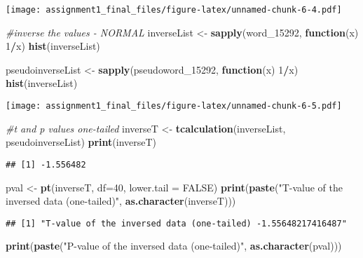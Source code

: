 \documentclass[
]{article}
\newenvironment{Shaded}{\begin{snugshade}}{\end{snugshade}}
\newcommand{\AttributeTok}[1]{\textcolor[rgb]{0.13,0.29,0.53}{#1}}
\newcommand{\CommentTok}[1]{\textcolor[rgb]{0.56,0.35,0.01}{\textit{#1}}}
\newcommand{\ConstantTok}[1]{\textcolor[rgb]{0.56,0.35,0.01}{#1}}
\newcommand{\ControlFlowTok}[1]{\textcolor[rgb]{0.13,0.29,0.53}{\textbf{#1}}}
\newcommand{\DecValTok}[1]{\textcolor[rgb]{0.00,0.00,0.81}{#1}}
\newcommand{\FunctionTok}[1]{\textcolor[rgb]{0.13,0.29,0.53}{\textbf{#1}}}
\newcommand{\NormalTok}[1]{#1}
\newcommand{\OtherTok}[1]{\textcolor[rgb]{0.56,0.35,0.01}{#1}}
\newcommand{\SpecialCharTok}[1]{\textcolor[rgb]{0.81,0.36,0.00}{\textbf{#1}}}
\newcommand{\StringTok}[1]{\textcolor[rgb]{0.31,0.60,0.02}{#1}}
\begin{document}
\texttt{[image: assignment1\_final\_files/figure-latex/unnamed-chunk-6-4.pdf]}

\begin{Shaded}
\begin{Highlighting}[]
\CommentTok{\#inverse the values {-} NORMAL}
\NormalTok{inverseList  }\OtherTok{\textless{}{-}} \FunctionTok{sapply}\NormalTok{(word\_15292, }\ControlFlowTok{function}\NormalTok{(x) }\DecValTok{1}\SpecialCharTok{/}\NormalTok{x)}
\FunctionTok{hist}\NormalTok{(inverseList)}

\NormalTok{pseudoinverseList  }\OtherTok{\textless{}{-}} \FunctionTok{sapply}\NormalTok{(pseudoword\_15292, }\ControlFlowTok{function}\NormalTok{(x) }\DecValTok{1}\SpecialCharTok{/}\NormalTok{x)}
\FunctionTok{hist}\NormalTok{(inverseList)}
\end{Highlighting}
\end{Shaded}

\texttt{[image: assignment1\_final\_files/figure-latex/unnamed-chunk-6-5.pdf]}

\begin{Shaded}
\begin{Highlighting}[]
\CommentTok{\#t and p values one{-}tailed}
\NormalTok{inverseT }\OtherTok{\textless{}{-}} \FunctionTok{tcalculation}\NormalTok{(inverseList, pseudoinverseList)}
\FunctionTok{print}\NormalTok{(inverseT)}
\end{Highlighting}
\end{Shaded}

\begin{verbatim}
## [1] -1.556482
\end{verbatim}

\begin{Shaded}
\begin{Highlighting}[]
\NormalTok{pval }\OtherTok{\textless{}{-}} \FunctionTok{pt}\NormalTok{(inverseT, }\AttributeTok{df=}\DecValTok{40}\NormalTok{, }\AttributeTok{lower.tail =} \ConstantTok{FALSE}\NormalTok{)}
\FunctionTok{print}\NormalTok{(}\FunctionTok{paste}\NormalTok{(}\StringTok{"T{-}value of the inversed data (one{-}tailed)"}\NormalTok{, }\FunctionTok{as.character}\NormalTok{(inverseT)))}
\end{Highlighting}
\end{Shaded}

\begin{verbatim}
## [1] "T-value of the inversed data (one-tailed) -1.55648217416487"
\end{verbatim}

\begin{Shaded}
\begin{Highlighting}[]
\FunctionTok{print}\NormalTok{(}\FunctionTok{paste}\NormalTok{(}\StringTok{"P{-}value of the inversed data (one{-}tailed)"}\NormalTok{, }\FunctionTok{as.character}\NormalTok{(pval)))}
\end{Highlighting}
\end{Shaded}
\end{document}
